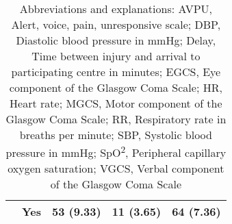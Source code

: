 \documentclass[10pt,letterpaper]{article}\usepackage[]{graphicx}\usepackage[]{color}
\begin{document}
\begin{table}[ht]
\begin{tabular}{lllll}
   & Yes & 53 (9.33) & 11 (3.65) & 64 (7.36) \\ 
   \hline
\end{tabular}
\caption*{Abbreviations and explanations: AVPU, Alert, voice, pain, unresponsive scale; DBP, Diastolic blood pressure in mmHg; Delay, Time between injury and arrival to participating centre in minutes; EGCS, Eye component of the Glasgow Coma Scale; HR, Heart rate; MGCS, Motor component of the Glasgow Coma Scale; RR, Respiratory rate in breaths per minute; SBP, Systolic blood pressure in mmHg; SpO\textsuperscript{2}, Peripheral capillary oxygen saturation; VGCS, Verbal component of the Glasgow Coma Scale} 
\end{table}


\end{document}
